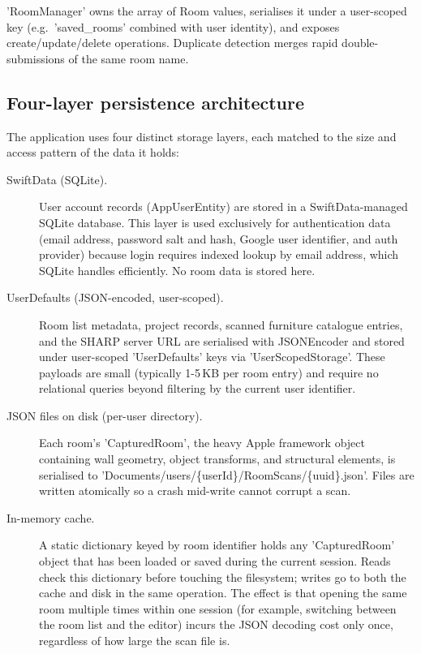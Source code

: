 'RoomManager' owns the array of Room values, serialises it under a user-scoped key (e.g.\ 'saved\_rooms' combined with user identity), and exposes create/update/delete operations. Duplicate detection merges rapid double-submissions of the same room name.

\subsection{Four-layer persistence architecture}

The application uses four distinct storage layers, each matched to the size and
access pattern of the data it holds:

\begin{description}
    \item[SwiftData (SQLite).] User account records (AppUserEntity) are
    stored in a SwiftData-managed SQLite database. This layer is used exclusively
    for authentication data (email address, password salt and hash, Google user
    identifier, and auth provider) because login requires indexed lookup by email
    address, which SQLite handles efficiently. No room data is stored here.

    \item[UserDefaults (JSON-encoded, user-scoped).] Room list metadata,
    project records, scanned furniture catalogue entries, and the SHARP server
    URL are serialised with JSONEncoder and stored under user-scoped
    'UserDefaults' keys via
    'UserScopedStorage'. These payloads are small (typically 1-5\,KB
    per room entry) and require no relational queries beyond filtering by the
    current user identifier.

    \item[JSON files on disk (per-user directory).] Each room's
    'CapturedRoom', the heavy Apple framework object containing wall
    geometry, object transforms, and structural elements, is serialised to
    'Documents/users/\{userId\}/RoomScans/\{uuid\}.json'. Files are written
    atomically so a crash mid-write cannot
    corrupt a scan. 

    \item[In-memory cache.] A static dictionary keyed by room identifier holds
    any 'CapturedRoom' object that has been loaded or saved during the
    current session. Reads check this dictionary before touching the filesystem;
    writes go to both the cache and disk in the same operation. The effect is
    that opening the same room multiple times within one session (for example,
    switching between the room list and the editor) incurs the JSON decoding
    cost only once, regardless of how large the scan file is.
\end{description}



